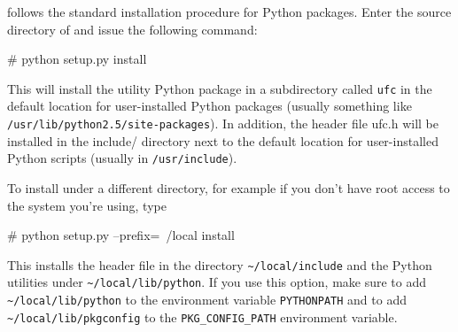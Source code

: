 \ufc{} follows the standard installation procedure for Python
packages. Enter the source directory of \ufc{} and issue the
following command:
\begin{code}
# python setup.py install
\end{code}
This will install the \ufc{} utility Python package in a subdirectory
called \texttt{ufc} in the default location for user-installed Python
packages (usually something like \texttt{/usr/lib/python2.5/site-packages}).
In addition, the header file ufc.h will be
installed in the include/ directory next to the default location for user-installed Python scripts
(usually in \texttt{/usr/include}).

To install \ufc{} under a different directory, for example if you don't have root access to the system you're using, type
\begin{code}
# python setup.py --prefix=~/local install 
\end{code}
This installs the \ufc{} header file in the directory \texttt{\~{}/local/include} and the Python utilities under \texttt{\~{}/local/lib/python}.
If you use this option, make sure to add \texttt{\~{}/local/lib/python} to the environment variable \texttt{PYTHONPATH}
and to add \texttt{\~{}/local/lib/pkgconfig} to the \texttt{PKG\_CONFIG\_PATH} environment variable.





